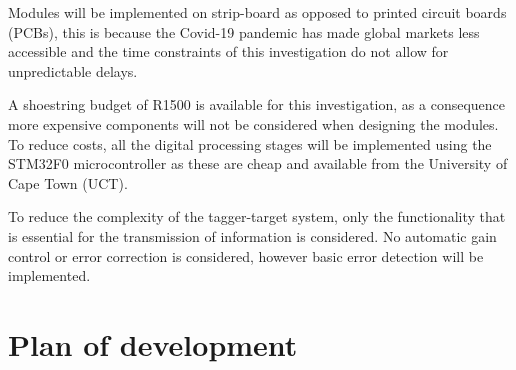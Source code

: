 Modules will be implemented on strip-board as opposed to printed circuit boards (PCBs), this is because the Covid-19 pandemic has made global markets less accessible and the time constraints of this investigation do not allow for unpredictable delays.

A shoestring budget of R1500 is available for this investigation, as a consequence more expensive components will not be considered when designing the modules. To reduce costs, all the digital processing stages will be implemented using the STM32F0 microcontroller as these are cheap and available from the University of Cape Town (UCT).

To reduce the complexity of the tagger-target system, only the functionality that is essential for the transmission of information is considered. No automatic gain control or error correction is considered, however basic error detection will be implemented.





\section{Plan of development}

